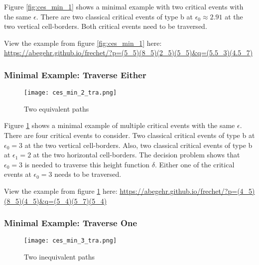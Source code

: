 Figure \ref{fig:ces_min_1} shows a minimal example with two critical events with the same $\epsilon$. There are two classical critical events of type b at $\epsilon_0 \approx 2.91$ at the two vertical cell-borders. Both critical events need to be traversed.

View the example from figure \ref{fig:ces_min_1} here: \url{https://abegehr.github.io/frechet/?p=(5_5)(8_5)(2_5)(5_5)&q=(5.5_3)(4.5_7)}


\subsubsection{Minimal Example: Traverse Either}\label{sec:ces_min_2}

\begin{figure}[H]
    \centering
    
    \texttt{[image: ces\_min\_2\_tra.png]}
		
	\caption{Two equivalent paths}
    \label{fig:ces_min_2}
\end{figure}

Figure \ref{fig:ces_min_2} shows a minimal example of multiple critical events with the same $\epsilon$. There are four critical events to consider. Two classical critical events of type b at $\epsilon_0 = 3$ at the two vertical cell-borders. Also, two classical critical events of type b at $\epsilon_1 = 2$ at the two horizontal cell-borders. The decision problem shows that $\epsilon_0 = 3$ is needed to traverse this height function $\delta$. Either one of the critical events at $\epsilon_0 = 3$ needs to be traversed.

View the example from figure \ref{fig:ces_min_2} here: \url{https://abegehr.github.io/frechet/?p=(4_5)(8_5)(4_5)&q=(5_4)(5_7)(5_4)}



\subsubsection{Minimal Example: Traverse One}

\begin{figure}[H]
    \centering
    
    \texttt{[image: ces\_min\_3\_tra.png]}
		
	\caption{Two inequivalent paths}
    \label{fig:ces_min_3}
\end{figure}

